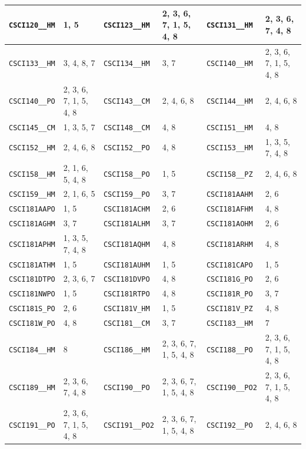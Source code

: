 \begin{longtable}{|l|l||l|l||l|l|}
    \verb|CSCI120__HM| & 1, 5 & \verb|CSCI123__HM| & 2, 3, 6, 7, 1, 5, 4, 8 & \verb|CSCI131__HM| & 2, 3, 6, 7, 4, 8\\\hline
    \verb|CSCI133__HM| & 3, 4, 8, 7 & \verb|CSCI134__HM| & 3, 7 & \verb|CSCI140__HM| & 2, 3, 6, 7, 1, 5, 4, 8\\\hline
    \verb|CSCI140__PO| & 2, 3, 6, 7, 1, 5, 4, 8 & \verb|CSCI143__CM| & 2, 4, 6, 8 & \verb|CSCI144__HM| & 2, 4, 6, 8\\\hline
    \verb|CSCI145__CM| & 1, 3, 5, 7 & \verb|CSCI148__CM| & 4, 8 & \verb|CSCI151__HM| & 4, 8\\\hline
    \verb|CSCI152__HM| & 2, 4, 6, 8 & \verb|CSCI152__PO| & 4, 8 & \verb|CSCI153__HM| & 1, 3, 5, 7, 4, 8\\\hline
    \verb|CSCI158__HM| & 2, 1, 6, 5, 4, 8 & \verb|CSCI158__PO| & 1, 5 & \verb|CSCI158__PZ| & 2, 4, 6, 8\\\hline
    \verb|CSCI159__HM| & 2, 1, 6, 5 & \verb|CSCI159__PO| & 3, 7 & \verb|CSCI181AAHM| & 2, 6\\\hline
    \verb|CSCI181AAPO| & 1, 5 & \verb|CSCI181ACHM| & 2, 6 & \verb|CSCI181AFHM| & 4, 8\\\hline
    \verb|CSCI181AGHM| & 3, 7 & \verb|CSCI181ALHM| & 3, 7 & \verb|CSCI181AOHM| & 2, 6\\\hline
    \verb|CSCI181APHM| & 1, 3, 5, 7, 4, 8 & \verb|CSCI181AQHM| & 4, 8 & \verb|CSCI181ARHM| & 4, 8\\\hline
    \verb|CSCI181ATHM| & 1, 5 & \verb|CSCI181AUHM| & 1, 5 & \verb|CSCI181CAPO| & 1, 5\\\hline
    \verb|CSCI181DTPO| & 2, 3, 6, 7 & \verb|CSCI181DVPO| & 4, 8 & \verb|CSCI181G_PO| & 2, 6\\\hline
    \verb|CSCI181NWPO| & 1, 5 & \verb|CSCI181RTPO| & 4, 8 & \verb|CSCI181R_PO| & 3, 7\\\hline
    \verb|CSCI181S_PO| & 2, 6 & \verb|CSCI181V_HM| & 1, 5 & \verb|CSCI181V_PZ| & 4, 8\\\hline
    \verb|CSCI181W_PO| & 4, 8 & \verb|CSCI181__CM| & 3, 7 & \verb|CSCI183__HM| & 7\\\hline
    \verb|CSCI184__HM| & 8 & \verb|CSCI186__HM| & 2, 3, 6, 7, 1, 5, 4, 8 & \verb|CSCI188__PO| & 2, 3, 6, 7, 1, 5, 4, 8\\\hline
    \verb|CSCI189__HM| & 2, 3, 6, 7, 4, 8 & \verb|CSCI190__PO| & 2, 3, 6, 7, 1, 5, 4, 8 & \verb|CSCI190__PO2| & 2, 3, 6, 7, 1, 5, 4, 8\\\hline
    \verb|CSCI191__PO| & 2, 3, 6, 7, 1, 5, 4, 8 & \verb|CSCI191__PO2| & 2, 3, 6, 7, 1, 5, 4, 8 & \verb|CSCI192__PO| & 2, 4, 6, 8\\\hline

\end{longtable}
